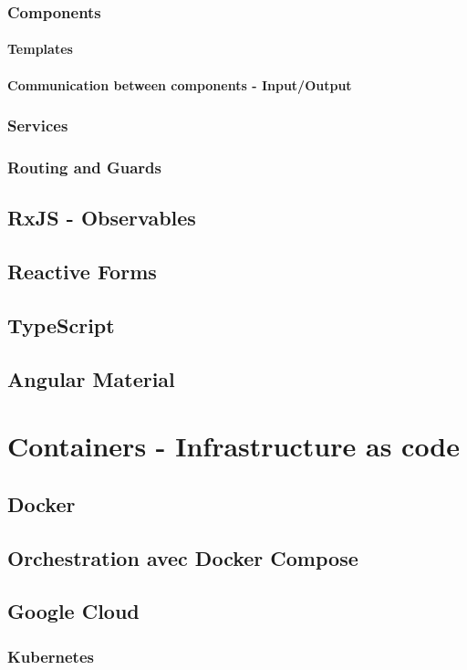 \documentclass[11pt,a4paper]{report}
\begin{document}
\subsubsection{Components}
\paragraph{Templates}
\paragraph{Communication between components - Input/Output}
\subsubsection{Services}
\subsubsection{Routing and Guards}
\subsection{RxJS - Observables}
\subsection{Reactive Forms}
\subsection{TypeScript}
\subsection{Angular Material}

\section{Containers - Infrastructure as code}
\subsection{Docker}
\subsection{Orchestration avec Docker Compose}
\subsection{Google Cloud}
\subsubsection{Kubernetes}
\end{document}
